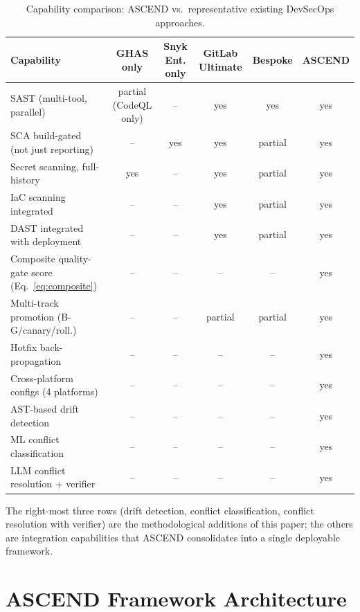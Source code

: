 \documentclass{ieeeaccess}
\begin{document}
\begin{table}[!t]
\caption{Capability comparison: ASCEND vs.\ representative existing DevSecOps approaches.}
\label{tab:baseline}
\centering
\begin{tabular}{lccccc}
\hline
\textbf{Capability} & \textbf{GHAS only} & \textbf{Snyk Ent. only} & \textbf{GitLab Ultimate} & \textbf{Bespoke} & \textbf{ASCEND} \\
\hline
SAST (multi-tool, parallel)              & partial (CodeQL only) & --     & yes & yes & yes \\
SCA build-gated (not just reporting)     & --     & yes & yes & partial & yes \\
Secret scanning, full-history            & yes    & --  & yes & partial & yes \\
IaC scanning integrated                  & --     & --  & yes & partial & yes \\
DAST integrated with deployment          & --     & --  & yes & partial & yes \\
Composite quality-gate score (Eq.~\eqref{eq:composite}) & -- & -- & -- & -- & yes \\
Multi-track promotion (B-G/canary/roll.) & --     & --  & partial & partial & yes \\
Hotfix back-propagation                  & --     & --  & --  & --     & yes \\
Cross-platform configs (4 platforms)     & --     & --  & --  & --     & yes \\
AST-based drift detection                & --     & --  & --  & --     & yes \\
ML conflict classification               & --     & --  & --  & --     & yes \\
LLM conflict resolution + verifier       & --     & --  & --  & --     & yes \\
\hline
\end{tabular}
\end{table}

The right-most three rows (drift detection, conflict classification, conflict resolution with verifier) are the methodological additions of this paper; the others are integration capabilities that ASCEND consolidates into a single deployable framework.

\section{ASCEND Framework Architecture}
\label{sec:arch}
\end{document}
